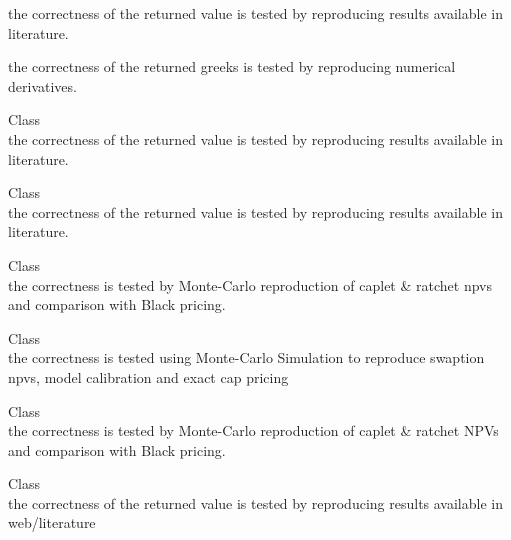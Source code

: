 \begin{DoxyRefList}
\begin{DoxyItemize}
\item the correctness of the returned value is tested by reproducing results available in literature.
\item the correctness of the returned greeks is tested by reproducing numerical derivatives. 
\end{DoxyItemize}
\item[Class \doxylink{class_quant_lib_1_1_ju_quadratic_approximation_engine}{Quant\+Lib\+::Ju\+Quadratic\+Approximation\+Engine} ]\hfill \\
\label{test__test000155}%
%
the correctness of the returned value is tested by reproducing results available in literature.  
\item[Class \doxylink{class_quant_lib_1_1_kirk_engine}{Quant\+Lib\+::Kirk\+Engine} ]\hfill \\
\label{test__test000114}%
%
the correctness of the returned value is tested by reproducing results available in literature.  
\item[Class \doxylink{class_quant_lib_1_1_lfm_hull_white_parameterization}{Quant\+Lib\+::Lfm\+Hull\+White\+Parameterization} ]\hfill \\
\label{test__test000028}%
%
the correctness is tested by Monte-\/\+Carlo reproduction of caplet \& ratchet npvs and comparison with Black pricing.  
\item[Class \doxylink{class_quant_lib_1_1_libor_forward_model}{Quant\+Lib\+::Libor\+Forward\+Model} ]\hfill \\
\label{test__test000030}%
%
the correctness is tested using Monte-\/\+Carlo Simulation to reproduce swaption npvs, model calibration and exact cap pricing  
\item[Class \doxylink{class_quant_lib_1_1_libor_forward_model_process}{Quant\+Lib\+::Libor\+Forward\+Model\+Process} ]\hfill \\
\label{test__test000029}%
%
the correctness is tested by Monte-\/\+Carlo reproduction of caplet \& ratchet NPVs and comparison with Black pricing. 
\item[Class \doxylink{class_quant_lib_1_1_longstaff_schwartz_multi_path_pricer}{Quant\+Lib\+::Longstaff\+Schwartz\+Multi\+Path\+Pricer} ]\hfill \\
\label{test__test000011}%
%
the correctness of the returned value is tested by reproducing results available in web/literature  

\end{DoxyRefList}
